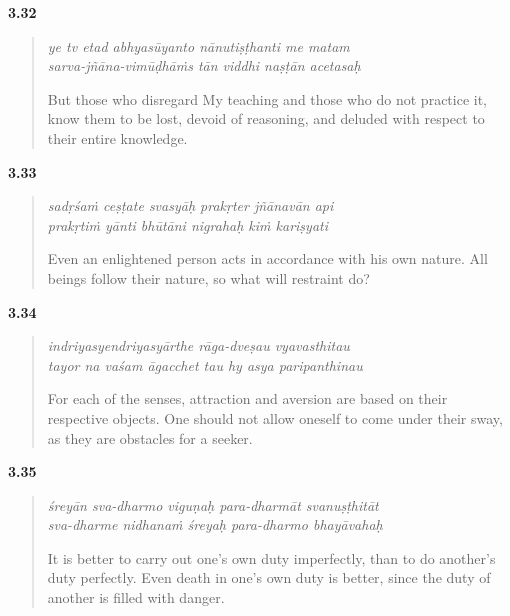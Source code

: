 \par\noindent\textbf{3.32}\par
\begin{verse}
\textit{ye tv etad abhyasūyanto nānutiṣṭhanti me matam} \\
\textit{sarva-jñāna-vimūḍhāṁs tān viddhi naṣṭān acetasaḥ}

\noindent But those who disregard My teaching and those who do not practice it, know them to be lost, devoid of reasoning, and deluded with respect to their entire knowledge.
\end{verse}
\par



\par\noindent\textbf{3.33}\par
\begin{verse}
\textit{sadṛśaṁ ceṣṭate svasyāḥ prakṛter jñānavān api} \\
\textit{prakṛtiṁ yānti bhūtāni nigrahaḥ kiṁ kariṣyati}

\noindent Even an enlightened person acts in accordance with his own nature. All beings follow their nature, so what will restraint do?
\end{verse}
\par



\par\noindent\textbf{3.34}\par
\begin{verse}
\textit{indriyasyendriyasyārthe rāga-dveṣau vyavasthitau} \\
\textit{tayor na vaśam āgacchet tau hy asya paripanthinau}

\noindent For each of the senses, attraction and aversion are based on their respective objects. One should not allow oneself to come under their sway, as they are obstacles for a seeker.
\end{verse}
\par



\par\noindent\textbf{3.35}\par
\begin{verse}
\textit{śreyān sva-dharmo viguṇaḥ para-dharmāt svanuṣṭhitāt} \\
\textit{sva-dharme nidhanaṁ śreyaḥ para-dharmo bhayāvahaḥ}

\noindent It is better to carry out one’s own duty imperfectly, than to do another's duty perfectly. Even death in one’s own duty is better, since the duty of another is filled with danger.
\end{verse}
\par


